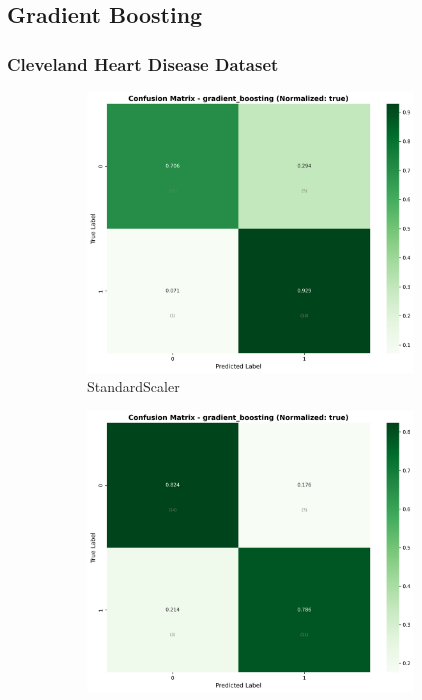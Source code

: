 \FloatBarrier

\subsection{Gradient Boosting}\label{subsec:gb}

\subsubsection{Cleveland Heart Disease Dataset}\label{subsubsec:gb-cleveland}

\begin{figure}[H]
\centering
\begin{subfigure}[b]{0.31\textwidth}\centering
\includegraphics[width=0.95\textwidth]{Result/cleveland_dataset/confusion_matrices/gradient_boosting_numeric_dataset_StandardScaler.png}
\caption{StandardScaler}\label{fig:gb_clev_cm_standard}
\end{subfigure}\hfill
\begin{subfigure}[b]{0.31\textwidth}\centering
\includegraphics[width=0.95\textwidth]{Result/cleveland_dataset/confusion_matrices/gradient_boosting_numeric_dataset_MinMaxScaler.png}

\end{subfigure}
\end{figure}
